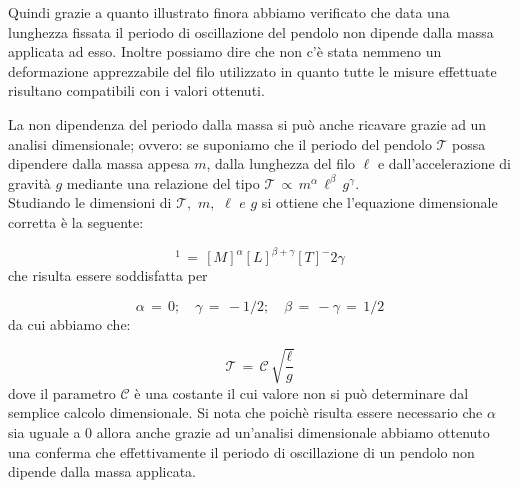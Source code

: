 Quindi grazie a quanto illustrato finora abbiamo verificato che data una lunghezza fissata il periodo di oscillazione del pendolo non dipende dalla massa applicata ad esso. Inoltre possiamo dire che non c'è stata nemmeno un deformazione apprezzabile del filo utilizzato in quanto tutte le misure effettuate risultano compatibili con i valori ottenuti.

La non dipendenza del periodo dalla massa si può anche ricavare grazie ad un analisi dimensionale; ovvero: se suponiamo che il periodo del pendolo $\mathcal{T}$ possa dipendere dalla massa appesa $m$, dalla lunghezza del filo $\ell$ e dall'accelerazione di gravità $g$ mediante una relazione del tipo $\mathcal{T} \,\propto\, m^\alpha \, \ell^\beta \, g^\gamma$.\\
Studiando le dimensioni di $\mathcal{T}, \,\, m, \,\, \ell \,\,e\,\, g$ si ottiene che l'equazione dimensionale corretta è la seguente:

\begin{equation*}
	[T]^1 \,=\, [M]^\alpha[L]^{\beta+\gamma}[T]^-2\gamma 
\end{equation*}
%
che risulta essere soddisfatta per

\begin{equation*}
	\alpha \,=\, 0; \quad \gamma \,=\, -1/2; \quad \beta \,=\, -\gamma \,=\, 1/2 
\end{equation*}
%
da cui abbiamo che:

\begin{equation*}
	\mathcal{T} \,=\, \mathcal{C} \, \sqrt{\frac{\ell}{g}}
\end{equation*}
%
dove il parametro $\mathcal{C}$ è una costante il cui valore non si può determinare dal semplice calcolo dimensionale. Si nota che poichè risulta essere necessario che $\alpha$ sia uguale a 0 allora anche grazie ad un'analisi dimensionale abbiamo ottenuto una conferma che effettivamente il periodo di oscillazione di un pendolo non dipende dalla massa applicata.
